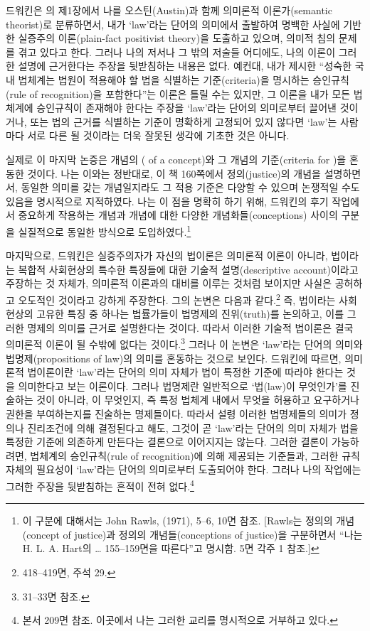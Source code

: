 드워킨은 의 제1장에서 나를 오스틴(Austin)과 함께
의미론적 이론가(semantic theorist)로 분류하면서, 내가 `law'라는 단어의
의미에서 출발하여 명백한 사실에 기반한 실증주의 이론(plain-fact
positivist theory)을 도출하고 있으며, 의미적 침의 문제를 겪고 있다고
한다. 그러나 나의 저서나 그 밖의 저술들 어디에도, 나의 이론이 그러한
설명에 근거한다는 주장을 뒷받침하는 내용은 없다. 예컨대, 내가 제시한
``성숙한 국내 법체계는 법원이 적용해야 할 법을 식별하는 기준(criteria)을
명시하는 승인규칙(rule of recognition)을 포함한다''는 이론은 틀릴 수는
있지만, 그 이론을 내가 모든 법체계에 승인규칙이 존재해야 한다는 주장을
`law'라는 단어의 의미로부터 끌어낸 것이거나, 또는 법의 근거를 식별하는
기준이 명확하게 고정되어 있지 않다면 `law'는 사람마다 서로 다른
 될 것이라는 더욱 잘못된 생각에 기초한 것은
아니다.

실제로 이 마지막 논증은 개념의 ( of a
concept)와 그 개념의  기준(criteria for )을
혼동한 것이다. 나는 이와는 정반대로, 이 책 160쪽에서 정의(justice)의
개념을 설명하면서, 동일한 의미를 갖는 개념일지라도 그 적용 기준은 다양할
수 있으며 논쟁적일 수도 있음을 명시적으로 지적하였다. 나는 이 점을
명확히 하기 위해, 드워킨의 후기 작업에서 중요하게 작용하는 개념과 개념에
대한 다양한 개념화들(conceptions) 사이의 구분을 실질적으로 동일한
방식으로 도입하였다.\footnote{이 구분에 대해서는 John Rawls,  (1971), 5--6, 10면 참조. {[}Rawls는 정의의
  개념(concept of justice)과 정의의 개념들(conceptions of justice)을
  구분하면서 ``나는 H. L. A. Hart의 \ldots{}
  155--159면을 따른다''고 명시함.  5면 각주 1
  참조.{]}}

마지막으로, 드워킨은 실증주의자가 자신의 법이론은 의미론적 이론이
아니라, 법이라는 복합적 사회현상의 특수한 특징들에 대한 기술적
설명(descriptive account)이라고 주장하는 것 자체가, 의미론적 이론과의
대비를 이루는 것처럼 보이지만 사실은 공허하고 오도적인 것이라고 강하게
주장한다. 그의 논변은 다음과 같다.\footnote{ 418--419면, 주석
  29.} 즉, 법이라는 사회현상의 고유한 특징 중 하나는 법률가들이 법명제의
진위(truth)를 논의하고, 이를 그러한 명제의 의미를 근거로 설명한다는
것이다. 따라서 이러한 기술적 법이론은 결국 의미론적 이론이 될 수밖에
없다는 것이다.\footnote{ 31--33면 참조.} 그러나 이 논변은
`law'라는 단어의 의미와 법명제(propositions of law)의 의미를 혼동하는
것으로 보인다. 드워킨에 따르면, 의미론적 법이론이란 `law'라는 단어의
의미 자체가 법이 특정한 기준에 따라야 한다는 것을 의미한다고 보는
이론이다. 그러나 법명제란 일반적으로 `법(law)이 무엇인가'를 진술하는
것이 아니라, 이 무엇인지, 즉 특정 법체계 내에서
무엇을 허용하고 요구하거나 권한을 부여하는지를 진술하는 명제들이다.
따라서 설령 이러한 법명제들의 의미가 정의나 진리조건에 의해 결정된다고
해도, 그것이 곧 `law'라는 단어의 의미 자체가 법을 특정한 기준에 의존하게
만든다는 결론으로 이어지지는 않는다. 그러한 결론이 가능하려면, 법체계의
승인규칙(rule of recognition)에 의해 제공되는 기준들과, 그러한 규칙
자체의 필요성이 `law'라는 단어의 의미로부터 도출되어야 한다. 그러나 나의
작업에는 그러한 주장을 뒷받침하는 흔적이 전혀 없다.\footnote{본서 209면
  참조. 이곳에서 나는 그러한 교리를 명시적으로 거부하고 있다.}

